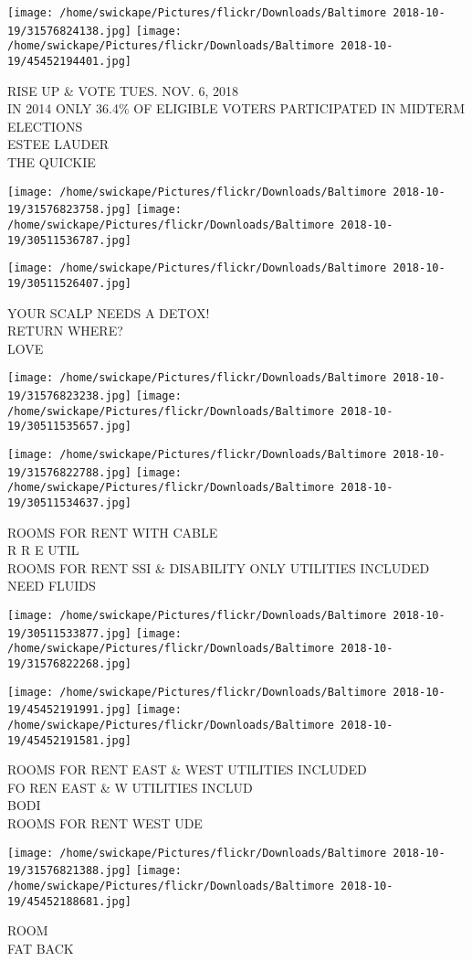 \documentclass[10pt,letterpaper]{article}
\begin{document}
\texttt{[image: /home/swickape/Pictures/flickr/Downloads/Baltimore 2018-10-19/31576824138.jpg]}
\texttt{[image: /home/swickape/Pictures/flickr/Downloads/Baltimore 2018-10-19/45452194401.jpg]}

RISE UP \& VOTE TUES. NOV. 6, 2018\\
IN 2014 ONLY 36.4\% OF ELIGIBLE VOTERS PARTICIPATED IN MIDTERM ELECTIONS\\
ESTEE LAUDER\\
THE QUICKIE\\
\pagebreak

\texttt{[image: /home/swickape/Pictures/flickr/Downloads/Baltimore 2018-10-19/31576823758.jpg]}
\texttt{[image: /home/swickape/Pictures/flickr/Downloads/Baltimore 2018-10-19/30511536787.jpg]}

\vspace{0.25in}
\texttt{[image: /home/swickape/Pictures/flickr/Downloads/Baltimore 2018-10-19/30511526407.jpg]}

YOUR SCALP NEEDS A DETOX!\\
RETURN WHERE?\\
LOVE\\
\pagebreak

\texttt{[image: /home/swickape/Pictures/flickr/Downloads/Baltimore 2018-10-19/31576823238.jpg]}
\texttt{[image: /home/swickape/Pictures/flickr/Downloads/Baltimore 2018-10-19/30511535657.jpg]}

\texttt{[image: /home/swickape/Pictures/flickr/Downloads/Baltimore 2018-10-19/31576822788.jpg]}
\texttt{[image: /home/swickape/Pictures/flickr/Downloads/Baltimore 2018-10-19/30511534637.jpg]}

ROOMS FOR RENT WITH CABLE\\
R R E UTIL\\
ROOMS FOR RENT SSI \& DISABILITY ONLY UTILITIES INCLUDED\\
NEED FLUIDS\\
\pagebreak

\texttt{[image: /home/swickape/Pictures/flickr/Downloads/Baltimore 2018-10-19/30511533877.jpg]}
\texttt{[image: /home/swickape/Pictures/flickr/Downloads/Baltimore 2018-10-19/31576822268.jpg]}

\texttt{[image: /home/swickape/Pictures/flickr/Downloads/Baltimore 2018-10-19/45452191991.jpg]}
\texttt{[image: /home/swickape/Pictures/flickr/Downloads/Baltimore 2018-10-19/45452191581.jpg]}

ROOMS FOR RENT EAST \& WEST UTILITIES INCLUDED\\
FO REN EAST \& W UTILITIES INCLUD\\
BODI\\
ROOMS FOR RENT WEST UDE\\
\pagebreak

\texttt{[image: /home/swickape/Pictures/flickr/Downloads/Baltimore 2018-10-19/31576821388.jpg]}
\texttt{[image: /home/swickape/Pictures/flickr/Downloads/Baltimore 2018-10-19/45452188681.jpg]}

ROOM\\
FAT BACK\\
\pagebreak
\end{document}
